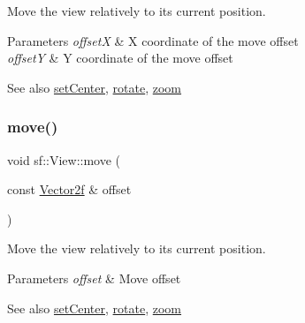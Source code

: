 Move the view relatively to its current position. 


\begin{DoxyParams}{Parameters}
{\em offsetX} & X coordinate of the move offset \\
\hline
{\em offsetY} & Y coordinate of the move offset\\
\hline
\end{DoxyParams}
\begin{DoxySeeAlso}{See also}
\mbox{\hyperlink{classsf_1_1_view_aa8e3fedb008306ff9811163545fb75f2}{set\+Center}}, \mbox{\hyperlink{classsf_1_1_view_a5fd3901aae1845586ca40add94faa378}{rotate}}, \mbox{\hyperlink{classsf_1_1_view_a4a72a360a5792fbe4e99cd6feaf7726e}{zoom}} \begin{DoxyVerb}\end{DoxyVerb}
 
\end{DoxySeeAlso}
\mbox{\label{classsf_1_1_view_a4c98a6e04fed756dfaff8f629de50862}} 
\subsubsection{\texorpdfstring{move()}{move()}\hspace{0.1cm}{\footnotesize\ttfamily [2/2]}}
{\footnotesize\ttfamily void sf\+::\+View\+::move (\begin{DoxyParamCaption}\item[{const \mbox{\hyperlink{classsf_1_1_vector2}{Vector2f}} \&}]{offset }\end{DoxyParamCaption})}



Move the view relatively to its current position. 


\begin{DoxyParams}{Parameters}
{\em offset} & Move offset\\
\hline
\end{DoxyParams}
\begin{DoxySeeAlso}{See also}
\mbox{\hyperlink{classsf_1_1_view_aa8e3fedb008306ff9811163545fb75f2}{set\+Center}}, \mbox{\hyperlink{classsf_1_1_view_a5fd3901aae1845586ca40add94faa378}{rotate}}, \mbox{\hyperlink{classsf_1_1_view_a4a72a360a5792fbe4e99cd6feaf7726e}{zoom}} \begin{DoxyVerb}\end{DoxyVerb}
 
\end{DoxySeeAlso}
\mbox{\label{classsf_1_1_view_ac95b636eafab3922b7e8304fb6c00d7d}} 
